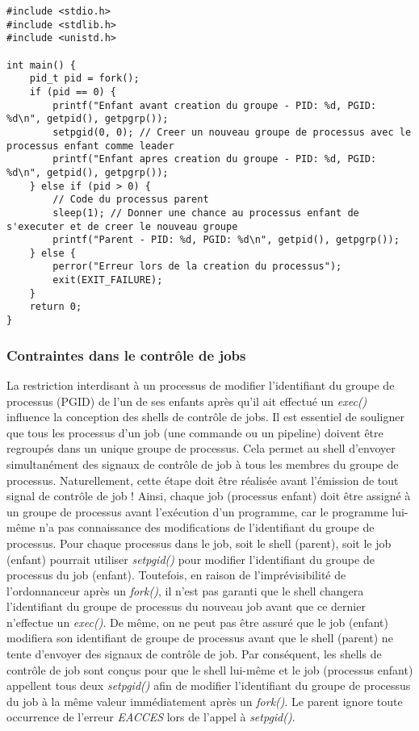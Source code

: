 \begin{lstlisting}[caption={creationGroupe.c}, label={creationGroupe.c}]
#include <stdio.h>
#include <stdlib.h>
#include <unistd.h>

int main() {
    pid_t pid = fork();
    if (pid == 0) {
        printf("Enfant avant creation du groupe - PID: %d, PGID: %d\n", getpid(), getpgrp());
        setpgid(0, 0); // Creer un nouveau groupe de processus avec le processus enfant comme leader
        printf("Enfant apres creation du groupe - PID: %d, PGID: %d\n", getpid(), getpgrp());
    } else if (pid > 0) {
        // Code du processus parent
        sleep(1); // Donner une chance au processus enfant de s'executer et de creer le nouveau groupe
        printf("Parent - PID: %d, PGID: %d\n", getpid(), getpgrp());
    } else {
        perror("Erreur lors de la creation du processus");
        exit(EXIT_FAILURE);
    }
    return 0;
}
\end{lstlisting}


\subsubsection{Contraintes dans le contrôle de jobs}

La restriction interdisant à un processus de modifier l'identifiant du groupe de processus (PGID) de l'un de ses enfants après qu'il ait effectué un \textit{exec()} influence la conception des shells de contrôle de jobs.
\newline
Il est essentiel de souligner que tous les processus d'un job (une commande ou un pipeline) doivent être regroupés dans un unique groupe de processus. Cela permet au shell d'envoyer simultanément des signaux de contrôle de job à tous les membres du groupe de processus. Naturellement, cette étape doit être réalisée avant l'émission de tout signal de contrôle de job !
\newline
Ainsi, chaque job (processus enfant) doit être assigné à un groupe de processus avant l'exécution d'un programme, car le programme lui-même n'a pas connaissance des modifications de l'identifiant du groupe de processus.
\newline
Pour chaque processus dans le job, soit le shell (parent), soit le job (enfant) pourrait utiliser \textit{setpgid()} pour modifier l'identifiant du groupe de processus du job (enfant). Toutefois, en raison de l'imprévisibilité de l'ordonnanceur après un \textit{fork()}, il n'est pas garanti que le shell changera l'identifiant du groupe de processus du nouveau job avant que ce dernier n'effectue un \textit{exec()}. De même, on ne peut pas être assuré que le job (enfant) modifiera son identifiant de groupe de processus avant que le shell (parent) ne tente d'envoyer des signaux de contrôle de job. Par conséquent, les shells de contrôle de job sont conçus pour que le shell lui-même et le job (processus enfant) appellent tous deux \textit{setpgid()} afin de modifier l'identifiant du groupe de processus du job à la même valeur immédiatement après un \textit{fork()}. Le parent ignore toute occurrence de l'erreur \textit{EACCES} lors de l'appel à \textit{setpgid()}.
\newline

